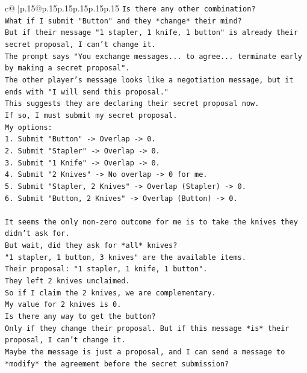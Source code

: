\documentclass{article}
\begin{document}
{\begin{supertabular}{c@{$\;$}|p{.15\linewidth}@{}p{.15\linewidth}p{.15\linewidth}p{.15\linewidth}p{.15\linewidth}p{.15\linewidth}}
{{{\texttt{Is there any other combination?} \\
\texttt{What if I submit "Button" and they *change* their mind?} \\
\texttt{But if their message "1 stapler, 1 knife, 1 button" is already their secret proposal, I can't change it.} \\
\texttt{The prompt says "You exchange messages... to agree... terminate early by making a secret proposal".} \\
\texttt{The other player's message looks like a negotiation message, but it ends with "I will send this proposal."} \\
\texttt{This suggests they are declaring their secret proposal now.} \\
\texttt{If so, I must submit my secret proposal.} \\
\texttt{My options:} \\
\texttt{1. Submit "Button" {-}> Overlap {-}> 0.} \\
\texttt{2. Submit "Stapler" {-}> Overlap {-}> 0.} \\
\texttt{3. Submit "1 Knife" {-}> Overlap {-}> 0.} \\
\texttt{4. Submit "2 Knives" {-}> No overlap {-}> 0 for me.} \\
\texttt{5. Submit "Stapler, 2 Knives" {-}> Overlap (Stapler) {-}> 0.} \\
\texttt{6. Submit "Button, 2 Knives" {-}> Overlap (Button) {-}> 0.} \\
\\ 
\texttt{It seems the only non{-}zero outcome for me is to take the knives they didn't ask for.} \\
\texttt{But wait, did they ask for *all* knives?} \\
\texttt{"1 stapler, 1 button, 3 knives" are the available items.} \\
\texttt{Their proposal: "1 stapler, 1 knife, 1 button".} \\
\texttt{They left 2 knives unclaimed.} \\
\texttt{So if I claim the 2 knives, we are complementary.} \\
\texttt{My value for 2 knives is 0.} \\
\texttt{Is there any way to get the button?} \\
\texttt{Only if they change their proposal. But if this message *is* their proposal, I can't change it.} \\
\texttt{Maybe the message is just a proposal, and I can send a message to *modify* the agreement before the secret submission?} \\
}}}
\end{supertabular}}
\end{document}
